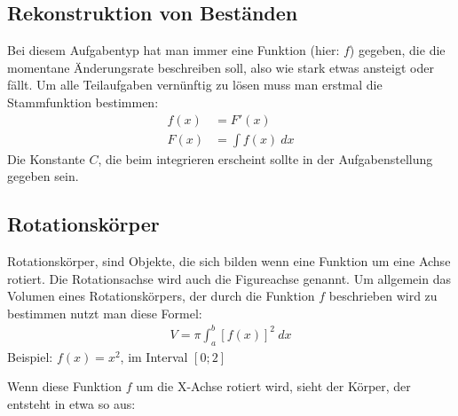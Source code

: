 \subsection{Rekonstruktion von Beständen}
\begin{flushleft}
    Bei diesem Aufgabentyp hat man immer eine Funktion (hier: $f$) gegeben, die die momentane Änderungsrate beschreiben soll, also wie stark etwas ansteigt oder fällt.
    Um alle Teilaufgaben vernünftig zu lösen muss man erstmal die Stammfunktion bestimmen:
    \begin{align}
        f(x)&=F'(x) \\
        F(x)&=\int f(x) \ dx
    \end{align}
    Die Konstante $C$, die beim integrieren erscheint sollte in der Aufgabenstellung gegeben sein.
\end{flushleft}

\subsection{Rotationskörper}
\begin{flushleft}
    Rotationskörper, sind Objekte, die sich bilden wenn eine Funktion um eine Achse rotiert.
    Die Rotationsachse wird auch die Figureachse genannt.
    Um allgemein das Volumen eines Rotationskörpers, der durch die Funktion $f$ beschrieben wird zu bestimmen nutzt man diese Formel:
    \begin{align}
        V=\pi\int_{a}^{b}\left[f(x)\right]^2 \ dx
    \end{align}
    Beispiel: $f(x)=x^2$, im Interval $[0;2]$
\end{flushleft}

\begin{center}
\end{center}

\begin{flushleft}
    Wenn diese Funktion $f$ um die X-Achse rotiert wird, sieht der Körper, der entsteht in etwa so aus:
\end{flushleft}

